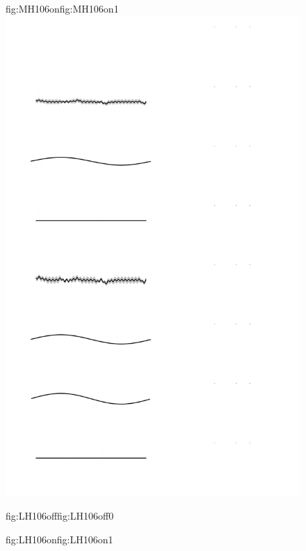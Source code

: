 \begin{figure}
\begin{ocg}{fig:MH106on}{fig:MH106on}{1}
  \includegraphics[width=0.8\hsize]{figures/analysisH106_models.png}%
  \end{ocg}
  \hspace{-0.8\hsize}%
  \begin{ocg}{fig:LH106off}{fig:LH106off}{0}%
  \end{ocg}%
  \begin{ocg}{fig:LH106on}{fig:LH106on}{1}%

\end{ocg}
\end{figure}
